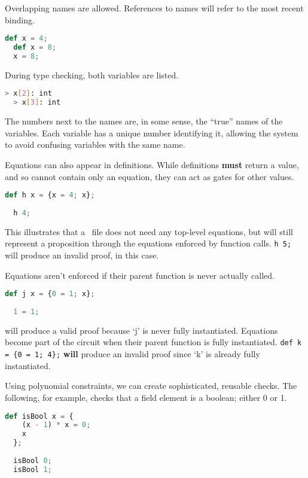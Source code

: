 Overlapping names are allowed. References to names will refer to the most recent binding.

\begin{lstlisting}[language=Python]
  def x = 4;
  def x = 8;
  x = 8;
\end{lstlisting}

During type checking, both variables are listed.

\begin{lstlisting}[language=bash]
  > x[2]: int
  > x[3]: int
\end{lstlisting}

The numbers next to the names are, in some sense, the ``true'' names of the variables. Each variable has a unique number identifying it, allowing the system to avoid confusing variables with the same name.

Equations can also appear in definitions. While definitions \textbf{must} return a value, and so cannot contain only an equation, they can act as gates for other values.


\begin{lstlisting}[language=Python]
  def h x = {x = 4; x};
  
  h 4;
\end{lstlisting}

This illustrates that a \vampir\ file does not need any top-level equations, but will still represent a proposition through the equations enforced by function calls. \lstinline{h 5;} will produce an invalid proof, in this case.

Equations aren't enforced if their parent function is never actually called.

\begin{lstlisting}[language=Python]
  def j x = {0 = 1; x};
  
  1 = 1;
\end{lstlisting}

will produce a valid proof because `j' is never fully instantiated. Equations become part of the circuit when their parent function is fully instantiated. \lstinline|def k = {0 = 1; 4};| \textbf{will} produce an invalid proof since `k' is already fully instantiated.

Using polynomial constraints, we can create sophisticated, reusable checks. The following, for example, checks that a field element is a boolean; either 0 or 1.

\begin{lstlisting}[language=Python]
  def isBool x = { 
    (x - 1) * x = 0;
    x
  };
  
  isBool 0;
  isBool 1;
\end{lstlisting}






